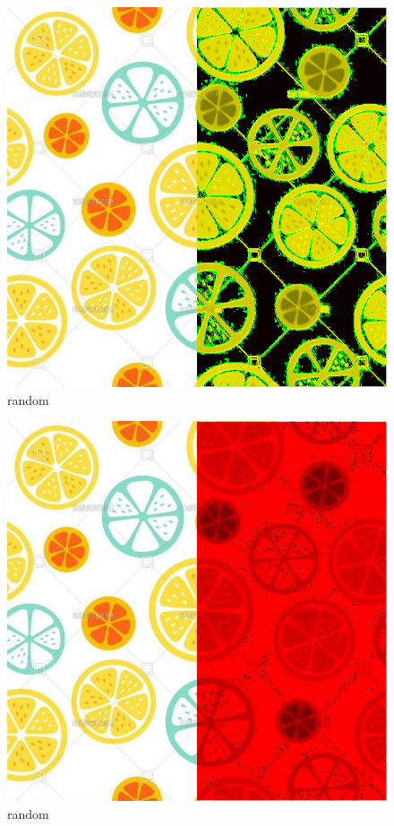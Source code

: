 \documentclass[10pt]{article}
\begin{document}
\begin{figure}[h]
  \centering
  \includegraphics*[scale=0.25]{微信图片_20210503105551.png}
\caption{ random }
\end{figure}
\begin{figure}[h]
  \centering
  \includegraphics*[scale=0.25]{微信图片_20210503105556.png}
\caption{ random }
\end{figure}
\end{document}
